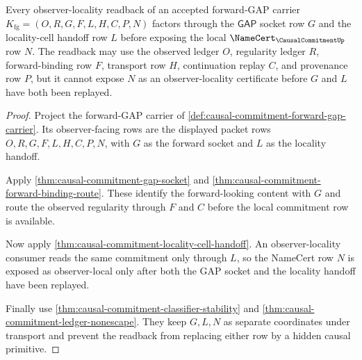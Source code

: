 \begin{theorem}
\label{thm:causal-commitment-locality-gap-readback}
Every observer-locality readback of an accepted forward-GAP carrier $K_{\mathrm{fg}}=(O,R,G,F,L,H,C,P,N)$ factors through the $\mathsf{GAP}$ socket row $G$ and the locality-cell handoff row $L$ before exposing the local $\NameCert_{\CausalCommitmentUp}$ row $N$. The readback may use the observed ledger $O$, regularity ledger $R$, forward-binding row $F$, transport row $H$, continuation replay $C$, and provenance row $P$, but it cannot expose $N$ as an observer-locality certificate before $G$ and $L$ have both been replayed.
\end{theorem}
\begin{proof}
Project the forward-GAP carrier of \autoref{def:causal-commitment-forward-gap-carrier}. Its observer-facing rows are the displayed packet rows $O,R,G,F,L,H,C,P,N$, with $G$ as the forward socket and $L$ as the locality handoff.

Apply \autoref{thm:causal-commitment-gap-socket} and \autoref{thm:causal-commitment-forward-binding-route}. These identify the forward-looking content with $G$ and route the observed regularity through $F$ and $C$ before the local commitment row is available.

Now apply \autoref{thm:causal-commitment-locality-cell-handoff}. An observer-locality consumer reads the same commitment only through $L$, so the NameCert row $N$ is exposed as observer-local only after both the GAP socket and the locality handoff have been replayed.

Finally use \autoref{thm:causal-commitment-classifier-stability} and \autoref{thm:causal-commitment-ledger-nonescape}. They keep $G,L,N$ as separate coordinates under transport and prevent the readback from replacing either row by a hidden causal primitive.
\end{proof}


